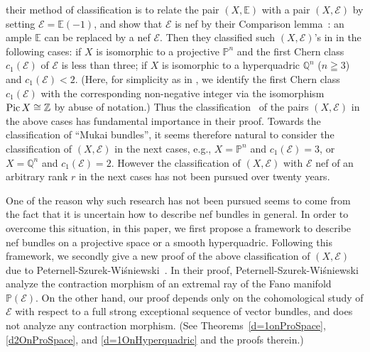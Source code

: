 \documentclass[a4paper,12pt]{amsart}
\newcommand{\Pic}{\mathop{\rm Pic}\nolimits}
\begin{document}
their method of classification is to relate
the pair $(X,\mathbb{E})$
with a pair $(X,\mathcal{E})$ by setting $\mathcal{E}=\mathbb{E}(-1)$,
and show that  $\mathcal{E}$ is nef by their Comparison lemma~\cite[(3.1)]{psw}:
an ample $\mathbb{E}$ can be replaced by a nef $\mathcal{E}$.
Then they 
classified 
such $(X,\mathcal{E})$'s
in \cite{pswnef}
in the following cases:
if $X$ is isomorphic to a projective  $\mathbb{P}^n$ and 
the first Chern class $c_1(\mathcal{E})$ of $\mathcal{E}$ is less than three;
if $X$ is isomorphic to a hyperquadric $\mathbb{Q}^n$ ($n\geqq 3$) and 
$c_1(\mathcal{E})< 2$.
(Here, for simplicity as in \cite{pswnef}, we identify the first Chern class $c_1(\mathcal{E})$
with the corresponding non-negative integer via the isomorphism $\Pic X\cong \mathbb{Z}$
by abuse of notation.)
Thus the classification~\cite{pswnef} of the pairs $(X,\mathcal{E})$ in the above cases has fundamental importance in their proof.
Towards the classification of ``Mukai bundles'',
it seems therefore natural to consider the classification of $(X,\mathcal{E})$ in the next cases,
e.g., $X=\mathbb{P}^n$ and $c_1(\mathcal{E})=3$,
or $X=\mathbb{Q}^n$ and $c_1(\mathcal{E})=2$.
However the classification  of $(X,\mathcal{E})$ with $\mathcal{E}$ nef
of an arbitrary rank $r$
in the next cases has not been pursued over twenty years.



One of the reason why such research has not been pursued seems to come from the fact that 
it is uncertain how to describe nef bundles in general.
In order to 
overcome 
this situation, in this paper, we first 
propose a framework 
to describe nef bundles 
on a projective space or a smooth hyperquadric.
Following this framework, we secondly
give a new proof of the above classification of $(X,\mathcal{E})$ 
due to Peternell-Szurek-Wi\'{s}niewski~\cite{pswnef}.
In their proof, 
Peternell-Szurek-Wi\'{s}niewski 
analyze the contraction morphism of an extremal ray
of the Fano manifold $\mathbb{P}(\mathcal{E})$.
On the other hand, our proof depends only on the cohomological study of $\mathcal{E}$ with respect to 
a full strong exceptional sequence of vector bundles, and does not analyze any contraction morphism.
(See Theorems~\ref{d=1onProSpace}, \ref{d2OnProSpace}, and \ref{d=1OnHyperquadric}
and the proofs therein.)
\end{document}
